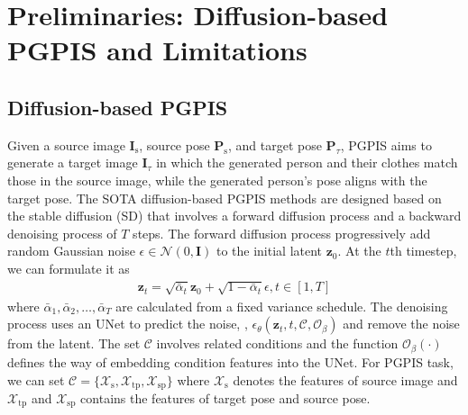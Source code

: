 \section{Preliminaries: Diffusion-based PGPIS and Limitations}
\label{sec:preliminary}


\subsection{Diffusion-based PGPIS }
\label{subsec:diff_pgpis}

Given a source image $\mathbf{I}_\text{s}$, source pose $\mathbf{P}_\text{s}$, and target pose $\mathbf{P}_\tau$, PGPIS aims to generate a target image $\mathbf{I}_\tau$ in which the generated person and their clothes match those in the source image, while the generated person's pose aligns with the target pose.
%
The SOTA diffusion-based PGPIS methods are designed based on the stable diffusion (SD) \cite{rombach2022high} that involves a forward diffusion process and a backward denoising process of $T$ steps.
%
%
The forward diffusion process progressively add random Gaussian noise $\epsilon\in \mathcal{N}(0,\mathbf{I})$ to the initial latent $\mathbf{z}_0$. At the $t$th timestep, we can formulate it as
%
\begin{align} \label{eq:forward_diffusion}
    \mathbf{z}_t = \sqrt{\bar{\alpha}_t}\mathbf{z}_0+ \sqrt{1-\bar{\alpha}_t}\epsilon, t\in[1,T]
\end{align}
%
where $\bar{\alpha}_1,\bar{\alpha}_2,\ldots,\bar{\alpha}_T$ are calculated from a fixed variance schedule. The denoising process uses an UNet to predict the noise, \ie, $\epsilon_\theta(\mathbf{z}_t, t, \mathcal{C},\mathcal{O}_\beta)$ and remove the noise from the latent.
%
The set $\mathcal{C}$ involves related conditions and the function $\mathcal{O}_\beta(\cdot)$ defines the way of embedding condition features into the UNet. 
%
For PGPIS task, we can set  $\mathcal{C} =\{\mathcal{X}_\text{s},\mathcal{X}_\text{tp}, \mathcal{X}_\text{sp}\}$ where $\mathcal{X}_\text{s}$ denotes the features of source image and $\mathcal{X}_\text{tp}$ and $\mathcal{X}_\text{sp}$ contains the features of target pose and source pose.
